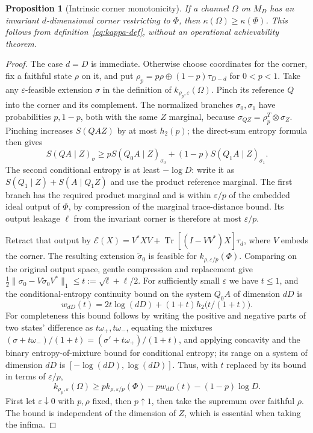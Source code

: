\documentclass[11pt,a4paper]{article}
\theoremstyle{plain}
\newtheorem{proposition}[theorem]{Proposition}
\theoremstyle{definition}
\theoremstyle{remark}
\DeclareMathOperator{\Tr}{Tr}
\begin{document}
\begin{proposition}[Intrinsic corner monotonicity]\label{prop:kappa-corner}
If a channel $\Omega$ on $M_D$ has an invariant $d$-dimensional corner restricting to $\Phi$, then
$\kappa(\Omega)\ge\kappa(\Phi)$. This follows from definition~\eqref{eq:kappa-def}, without an operational achievability theorem.
\end{proposition}
\begin{proof}
The case $d=D$ is immediate. Otherwise choose coordinates for the corner, fix a faithful state $\rho$ on it, and put
$\rho_p=p\rho\oplus(1-p)\tau_{D-d}$ for $0<p<1$. Take any $\varepsilon$-feasible extension $\sigma$ in the definition of
$k_{\rho_p,\varepsilon}(\Omega)$. Pinch its reference $Q$ into the corner and its complement. The normalized branches $\sigma_0,\sigma_1$
have probabilities $p,1-p$, both with the same $Z$ marginal, because $\sigma_{QZ}=\rho_p^T\otimes\sigma_Z$.
Pinching increases $S(QAZ)$ by at most $h_2(p)$; the direct-sum entropy formula then gives
\[
S(QA\mid Z)_\sigma\ge p S(Q_0A\mid Z)_{\sigma_0}+(1-p)S(Q_1A\mid Z)_{\sigma_1}.
\]
The second conditional entropy is at least $-\log D$: write it as $S(Q_1\mid Z)+S(A\mid Q_1Z)$ and use the product reference marginal.
The first branch has the required product marginal and is within $\varepsilon/p$ of the embedded ideal output of $\Phi$, by compression
of the marginal trace-distance bound. Its output leakage $\ell$ from the invariant corner is therefore at most $\varepsilon/p$.

Retract that output by $\mathcal E(X)=V^*XV+\Tr[(I-VV^*)X]\tau_d$, where $V$ embeds the corner. The resulting extension
$\widetilde\sigma_0$ is feasible for $k_{\rho,\varepsilon/p}(\Phi)$. Comparing on the original output space, gentle compression and replacement
give $\tfrac12\|\sigma_0-V\widetilde\sigma_0V^*\|_1\le t:=\sqrt\ell+\ell/2$.
For sufficiently small $\varepsilon$ we have $t\le1$, and the conditional-entropy continuity bound on the system $Q_0A$ of dimension $dD$ is
\[
w_{dD}(t)=2t\log(dD)+(1+t)h_2\bigl(t/(1+t)\bigr).
\]
For completeness this bound follows by writing the positive and negative parts of two states' difference as $t\omega_+,t\omega_-$,
equating the mixtures $(\sigma+t\omega_-)/(1+t)=(\sigma'+t\omega_+)/(1+t)$, and applying concavity and the binary entropy-of-mixture
bound for conditional entropy; its range on a system of dimension $dD$ is $[-\log(dD),\log(dD)]$.
Thus, with $t$ replaced by its bound in terms of $\varepsilon/p$,
\[
k_{\rho_p,\varepsilon}(\Omega)\ge p k_{\rho,\varepsilon/p}(\Phi)-p w_{dD}(t)-(1-p)\log D.
\]
First let $\varepsilon\downarrow0$ with $p,\rho$ fixed, then $p\uparrow1$, then take the supremum over faithful $\rho$.
The bound is independent of the dimension of $Z$, which is essential when taking the infima.
\end{proof}
\end{document}
